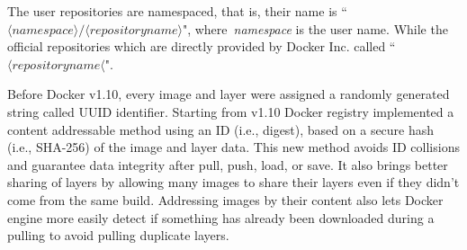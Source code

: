 The user repositories are namespaced, that is, their name is
``$\langle namespace\rangle/\langle repository name \rangle$",
where~\textit{namespace} is the user name. While the official repositories which
are directly provided by Docker Inc. called ``$\langle repository name \langle$".
%
%



Before Docker v1.10, every image and layer were assigned a randomly generated string
called UUID identifier.
%
%
Starting from v1.10 Docker registry implemented a content addressable method using an
ID (i.e., digest), based on a secure hash (i.e., SHA-256) of the image and layer data.
%
This new method avoids ID collisions and guarantee data integrity after pull, push,
load, or save.
%
%
%
It also brings better sharing of layers by allowing many images to share their
layers even if they didn't come from the same build.
%
Addressing images by their content also lets Docker engine more easily detect
if something has already been downloaded during a pulling to avoid pulling
duplicate layers.
%








